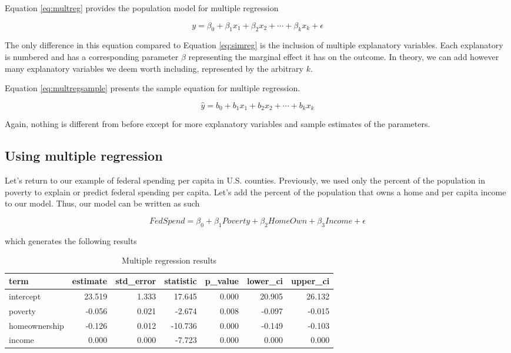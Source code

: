 \documentclass[
]{book}
\begin{document}
Equation \eqref{eq:multreg} provides the population model for multiple regression

\begin{equation}
y=\beta_0+\beta_1x_1+\beta_2x_2+\cdots+\beta_kx_k+\epsilon
\label{eq:multreg}
\end{equation}

The only difference in this equation compared to Equation \eqref{eq:simreg} is the inclusion of multiple explanatory variables. Each explanatory is numbered and has a corresponding parameter \(\beta\) representing the marginal effect it has on the outcome. In theory, we can add however many explanatory variables we deem worth including, represented by the arbitrary \(k\).

Equation \eqref{eq:multregsample} presents the sample equation for multiple regression.

\begin{equation}
\hat{y}=b_0+b_1x_1+b_2x_2+\cdots +b_kx_k
\label{eq:multregsample}
\end{equation}

Again, nothing is different from before except for more explanatory variables and sample estimates of the parameters.

\hypertarget{using-multiple-regression}{%
\subsection{Using multiple regression}\label{using-multiple-regression}}

Let's return to our example of federal spending per capita in U.S. counties. Previously, we used only the percent of the population in poverty to explain or predict federal spending per capita. Let's add the percent of the population that owns a home and per capita income to our model. Thus, our model can be written as such

\begin{equation}
FedSpend = \beta_0 + \beta_1Poverty + \beta_2HomeOwn + \beta_3Income + \epsilon
\label{eq:multregex}
\end{equation}

which generates the following results

\begin{table}

\caption{\label{tab:multregextab}Multiple regression results}
\centering
\begin{tabular}[t]{l|r|r|r|r|r|r}
\hline
term & estimate & std\_error & statistic & p\_value & lower\_ci & upper\_ci\\
\hline
intercept & 23.519 & 1.333 & 17.645 & 0.000 & 20.905 & 26.132\\
\hline
poverty & -0.056 & 0.021 & -2.674 & 0.008 & -0.097 & -0.015\\
\hline
homeownership & -0.126 & 0.012 & -10.736 & 0.000 & -0.149 & -0.103\\
\hline
income & 0.000 & 0.000 & -7.723 & 0.000 & 0.000 & 0.000\\
\hline
\end{tabular}
\end{table}
\end{document}
